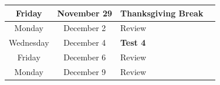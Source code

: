 \documentclass[12pt]{article}
\begin{document}
\begin{center}
\begin{tabular}{|c|c|l|l|}
\hline
Friday & November 29 & \textbf{Thanksgiving Break}\\

\hline
Monday & December 2 & Review\\

\hline
Wednesday & December 4 & \textbf{Test 4} \\

\hline
Friday & December 6 & Review\\

\hline
Monday & December 9 & Review\\
 \hline

\end{tabular}
\end{center}
\end{document}
